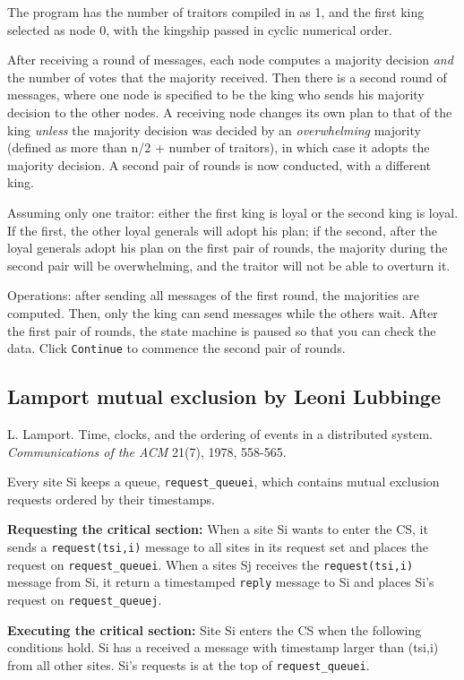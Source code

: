 \documentclass[11pt]{article}
\newcommand{\p}[1]{\texttt{#1}}
\begin{document}
The program has the number of traitors compiled in as 1,
and the first king selected as node 0, with the kingship
passed in cyclic numerical order.

After receiving a round of messages, each node computes a
majority decision \emph{and} the number of votes that the
majority received. Then there is a second round of messages,
where one node is specified to be the king who sends his
majority decision to the other nodes. A receiving node changes
its own plan to that of the king \emph{unless} the majority
decision was decided by an \emph{overwhelming} majority (defined
as more than n/2 + number of traitors), in which case it adopts
the majority decision. A second pair of rounds is now conducted,
with a different king.

Assuming only one traitor: either the first king is loyal or the
second king is loyal. If the first, the other loyal generals
will adopt his plan; if the second, after the loyal generals
adopt his plan on the first pair of rounds, the majority during
the second pair will be overwhelming, and the traitor will not
be able to overturn it.

Operations: after sending all messages of the first round, the
majorities are computed. Then, only the king can send messages
while the others wait. After the first pair of rounds, the state
machine is paused so that you can check the data. Click
\p{Continue} to commence the second pair of rounds.
\subsection{Lamport mutual exclusion by Leoni Lubbinge}

L. Lamport. Time, clocks, and the ordering of
events in a distributed system.
\emph{Communications of the ACM} 21(7), 1978, 558-565.

Every site Si keeps a queue, \p{request\_queuei}, which contains mutual exclusion
requests ordered by their timestamps.

\textbf{Requesting the critical section:}
When a site Si wants to enter the CS, it sends a \p{request(tsi,i)} message
to all sites in its request set and places the request on \p{request\_queuei}.
When a sites Sj receives the \p{request(tsi,i)} message from Si, it return
a timestamped \p{reply} message to Si and places Si's request on \p{request\_queuej}.

\textbf{Executing the critical section:}
Site Si enters the CS when the following conditions hold.
Si has a received a message with timestamp larger than (tsi,i) from all
other sites.
Si's requests is at the top of \p{request\_queuei}.
\end{document}
